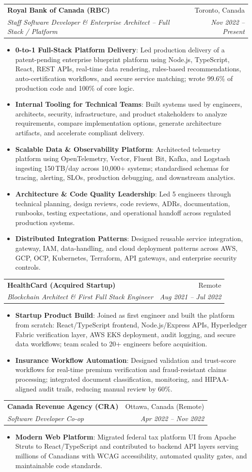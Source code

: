 \documentclass[letterpaper,9.5pt]{article}
\makeatletter
\newcommand{\resumeItem}[2]{\item\small{\textbf{#1}{: #2 \vspace{-2pt}}}}
\newcommand{\resumeSubheading}[4]{\vspace{-2pt}\item\begin{tabular*}{0.97\textwidth}{l@{\extracolsep{\fill}}r}\textbf{#1} & #2 \\\textit{\small#3} & \textit{\small #4} \\\end{tabular*}\vspace{-6pt}}
\newcommand{\resumeItemListStart}{\begin{itemize}}
\newcommand{\resumeItemListEnd}{\end{itemize}\vspace{-6pt}}
\makeatother
\begin{document}
  \resumeSubheading
    {Royal Bank of Canada (RBC)}{Toronto, Canada}
    {Staff Software Developer \& Enterprise Architect -- Full Stack / Platform}{Nov 2022 -- Present}
  \resumeItemListStart
    \resumeItem{0-to-1 Full-Stack Platform Delivery}
      {Led production delivery of a patent-pending enterprise blueprint platform using Node.js, TypeScript, React, REST APIs, real-time data rendering, rules-based recommendations, auto-certification workflows, and secure service matching; wrote 99.6\% of production code and 100\% of core logic.}
    \resumeItem{Internal Tooling for Technical Teams}
      {Built systems used by engineers, architects, security, infrastructure, and product stakeholders to analyze requirements, compare implementation options, generate architecture artifacts, and accelerate compliant delivery.}
    \resumeItem{Scalable Data \& Observability Platform}
      {Architected telemetry platform using OpenTelemetry, Vector, Fluent Bit, Kafka, and Logstash ingesting 150\,TB/day across 10,000+ systems; standardised schemas for tracing, alerting, SLOs, production debugging, and downstream analytics.}
    \resumeItem{Architecture \& Code Quality Leadership}
      {Led 5 engineers through technical planning, design reviews, code reviews, ADRs, documentation, runbooks, testing expectations, and operational handoff across regulated production systems.}
    \resumeItem{Distributed Integration Patterns}
      {Designed reusable service integration, gateway, IAM, data-handling, and cloud deployment patterns across AWS, GCP, OCP, Kubernetes, Terraform, API gateways, and enterprise security controls.}
  \resumeItemListEnd

  \resumeSubheading
    {HealthCard (Acquired Startup)}{Remote}
    {Blockchain Architect \& First Full Stack Engineer}{Aug 2021 -- Jul 2022}
  \resumeItemListStart
    \resumeItem{Startup Product Build}
      {Joined as first engineer and built the platform from scratch: React/TypeScript frontend, Node.js/Express APIs, Hyperledger Fabric verification layer, AWS EKS deployment, audit logging, and secure data workflows; team scaled to 20+ engineers before acquisition.}
    \resumeItem{Insurance Workflow Automation}
      {Designed validation and trust-score workflows for real-time premium verification and fraud-resistant claims processing; integrated document classification, monitoring, and HIPAA-aligned audit trails, reducing manual review by 60\%.}
  \resumeItemListEnd

  \resumeSubheading
    {Canada Revenue Agency (CRA)}{Ottawa, Canada (Remote)}
    {Software Developer Co-op}{Apr 2022 -- Nov 2022}
  \resumeItemListStart
    \resumeItem{Modern Web Platform}
      {Migrated federal tax platform UI from Apache Struts to React/TypeScript and contributed to backend API layers serving millions of Canadians with WCAG accessibility, automated quality gates, and maintainable code standards.}
  \resumeItemListEnd
\end{document}
